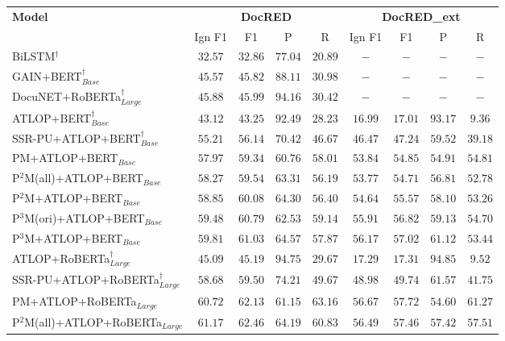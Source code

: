 \documentclass[11pt]{article}
\begin{document}
\begin{table}[!ht]
\centering
\small
\begin{tabular}{lcccc|cccc}
\toprule
\multirow{2}{*}{\textbf{Model}} & \multicolumn{4}{c}{\textbf{DocRED}} & \multicolumn{4}{c}{\textbf{DocRED\_ext}} \\
\cmidrule(l){2-9} & Ign F1 & F1 & P & R & Ign F1 & F1 & P & R \\ \midrule
BiLSTM$^{\dagger}$ & $32.57$ & $32.86$ & $77.04$ & $20.89$ & $-$ & $-$ & $-$ & $-$ \\
GAIN+BERT$_{Base}^{\dagger}$ & $45.57$ & $45.82$ & $88.11$ & $30.98$ & $-$ & $-$ & $-$ & $-$ \\
DocuNET+RoBERTa$_{Large}^{\dagger}$ & $45.88$ & $45.99$ & $94.16$ & $30.42$ & $-$ & $-$ & $-$ & $-$ \\
\midrule
ATLOP+BERT$_{Base}^{\dagger}$ & $43.12$ & $43.25$ & $\mathbf{92.49}$ & $28.23$ & $16.99$ & $17.01$ & $\mathbf{93.17}$ & $9.36$ \\
SSR-PU+ATLOP+BERT$_{Base}^{\dagger}$ & $55.21$ & $56.14$ & $70.42$ & $46.67$ & $46.47$ & $47.24$ & $59.52$ & $39.18$ \\
PM+ATLOP+BERT$_{Base}$ & $57.97$ & $59.34$ & $60.76$ & $58.01$ & $53.84$ & $54.85$ & $54.91$ & $\mathbf{54.81}$ \\
P$^{2}$M(all)+ATLOP+BERT$_{Base}$ & $58.27$ & $59.54$ & $63.31$ & $56.19$ & $53.77$ & $54.71$ & $56.81$ & $52.78$ \\
P$^{2}$M+ATLOP+BERT$_{Base}$ & $58.85$ & $60.08$ & $64.30$ & $56.40$ & $54.64$ & $55.57$ & $58.10$ & $53.26$ \\
P$^{3}$M(ori)+ATLOP+BERT$_{Base}$ & $59.48$ & $60.79$ & $62.53$ & $\mathbf{59.14}$ & $55.91$ & $56.82$ & $59.13$ & $54.70$ \\
P$^{3}$M+ATLOP+BERT$_{Base}$ & $\mathbf{59.81}$ & $\mathbf{61.03}$ & $64.57$ & $57.87$ & $\mathbf{56.17}$ & $\mathbf{57.02}$ & $61.12$ & $53.44$ \\
\midrule
ATLOP+RoBERTa$_{Large}^{\dagger}$ & $45.09$ & $45.19$ & $\mathbf{94.75}$ & $29.67$ & $17.29$ & $17.31$ & $\mathbf{94.85}$ & $9.52$ \\
SSR-PU+ATLOP+RoBERTa$_{Large}^{\dagger}$ & $58.68$ & $59.50$ & $74.21$ & $49.67$ & $48.98$ & $49.74$ & $61.57$ & $41.75$ \\
PM+ATLOP+RoBERTa$_{Large}$ & $60.72$ & $62.13$ & $61.15$ & $63.16$ & $56.67$ & $57.72$ & $54.60$ & $\mathbf{61.27}$ \\
P$^{2}$M(all)+ATLOP+RoBERTa$_{Large}$ & $61.17$ & $62.46$ & $64.19$ & $60.83$ & $56.49$ & $57.46$ & $57.42$ & $57.51$ \\

\end{tabular}
\end{table}
\end{document}
